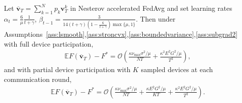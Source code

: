 \begin{thm}
	Let $\overline{\mathbf{v}}_{T}=\sum_{k=1}^{N}p_{k}\mathbf{v}_{T}^{k}$ in Nesterov accelerated FedAvg
	and set learning rates $\alpha_{t}=\frac{6}{\mu}\frac{1}{t+\gamma}$,  $\beta_{t-1}=\frac{3}{14(t+\gamma)(1-\frac{6}{t+\gamma})\max\{\mu,1\}}$. Then under Assumptions~\ref{ass:lsmooth},\ref{ass:stroncvx},\ref{ass:boundedvariance},\ref{ass:subgrad2} with full device participation, 
	\begin{align*}
	\mathbb{E}F(\overline{\mathbf{v}}_{T})-F^{\ast}=\mathcal{O}\left(\frac{\kappa\nu_{\max}\sigma^{2}/\mu}{NT}+\frac{\kappa^{2}E^{2}G^{2}/\mu}{T^{2}}\right),
	\end{align*}
	and with partial device participation with $K$ sampled devices at
	each communication round, 
	\begin{align*}
	\mathbb{E}F(\overline{\mathbf{v}}_{T})-F^{\ast}=\mathcal{O}\left(\frac{\kappa\nu_{\max}\sigma^{2}/\mu}{NT}+\frac{\kappa E^{2}G^{2}/\mu}{KT}+\frac{\kappa^{2}E^{2}G^{2}/\mu}{T^{2}}\right).
	\end{align*}
\end{thm}
%
%

\begin{comment}
This implies that $E$ canot be chosen $O(T^{\beta})$ for any $\beta>0$
without degrading the performance. This should be checked in experiments,
whether with partial participation if the communication round is set
to scale with $T$, the convergence deteriorates. This is in constrast
with the full participation case, where $E=O(\sqrt{\frac{T}{N}})$
is allowed. \textbf{If we can confirm that full participation allows
linear speedup with $\nu=N\cdot\max_{k}p_{k}\approx1$ and $E=O(\sqrt{\frac{T}{N}})$,
whereas partial participation only allows $E=O(1)$, then this would
an interesting phenomenon that is not reported by previous studies!}

The convergence result implies that with fixed $E$, as long as \$N\$
satisfies \$E=O(\textbackslash sqrt\{T/N\})\$, there is linear speedup.
When \$N\$ exceeds an upper bound, however, linear speedup may fail
to happen, and \$T/N\$ may remain constant, i.e. the number of iterations
required for convergence may increase with \$N\$. 
\end{comment}

